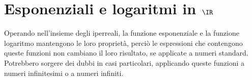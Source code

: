 %  
% 
% 
% 
% 
% 
% 
% 
% 
% 
% 
% 
% 


\section{Esponenziali e logaritmi in \(\IR\)}
\label{sec:esplog_IR}
Operando nell'insieme degli iperreali, la funzione esponenziale e la 
funzione logaritmo mantengono le loro proprietà, perciò le espressioni che 
contengono queste funzioni non cambiano il loro risultato, se applicate a 
numeri standard. Potrebbero sorgere dei dubbi in casi particolari, 
applicando queste funzioni a numeri infinitesimi o a numeri infiniti.

